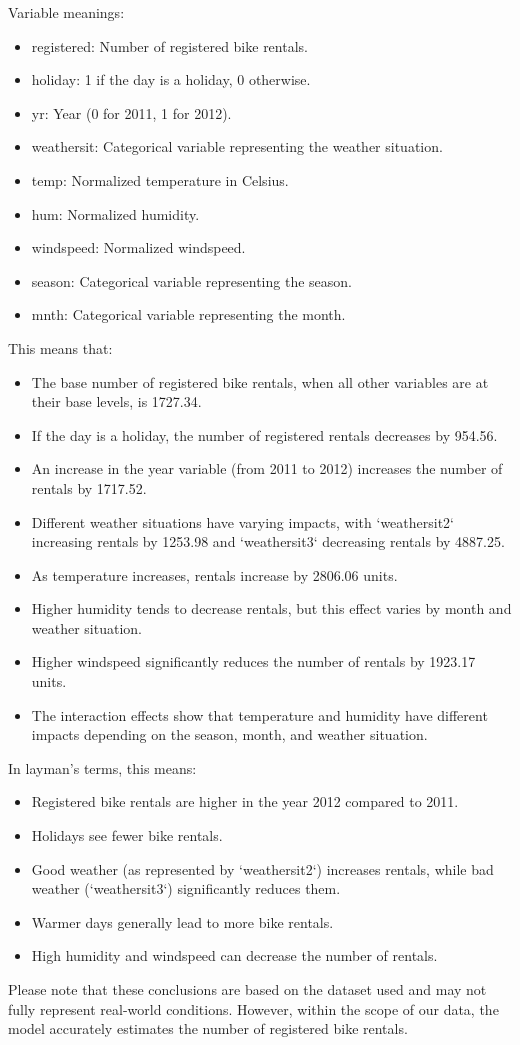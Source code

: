 Variable meanings:

\begin{itemize}
    \item registered: Number of registered bike rentals.
    \item holiday: 1 if the day is a holiday, 0 otherwise.
    \item yr: Year (0 for 2011, 1 for 2012).
    \item weathersit: Categorical variable representing the weather situation.
    \item temp: Normalized temperature in Celsius.
    \item hum: Normalized humidity.
    \item windspeed: Normalized windspeed.
    \item season: Categorical variable representing the season.
    \item mnth: Categorical variable representing the month.
\end{itemize}

This means that:

\begin{itemize}
    \item The base number of registered bike rentals, when all other variables are at their base levels, is 1727.34.
    \item If the day is a holiday, the number of registered rentals decreases by 954.56.
    \item An increase in the year variable (from 2011 to 2012) increases the number of rentals by 1717.52.
    \item Different weather situations have varying impacts, with `weathersit2` increasing rentals by 1253.98 and `weathersit3` decreasing rentals by 4887.25.
    \item As temperature increases, rentals increase by 2806.06 units.
    \item Higher humidity tends to decrease rentals, but this effect varies by month and weather situation.
    \item Higher windspeed significantly reduces the number of rentals by 1923.17 units.
    \item The interaction effects show that temperature and humidity have different impacts depending on the season, month, and weather situation.
\end{itemize}

In layman's terms, this means:

\begin{itemize}
    \item Registered bike rentals are higher in the year 2012 compared to 2011.
    \item Holidays see fewer bike rentals.
    \item Good weather (as represented by `weathersit2`) increases rentals, while bad weather (`weathersit3`) significantly reduces them.
    \item Warmer days generally lead to more bike rentals.
    \item High humidity and windspeed can decrease the number of rentals.
\end{itemize}

Please note that these conclusions are based on the dataset used and may not fully represent real-world conditions. However, within the scope of our data, the model accurately estimates the number of registered bike rentals.
